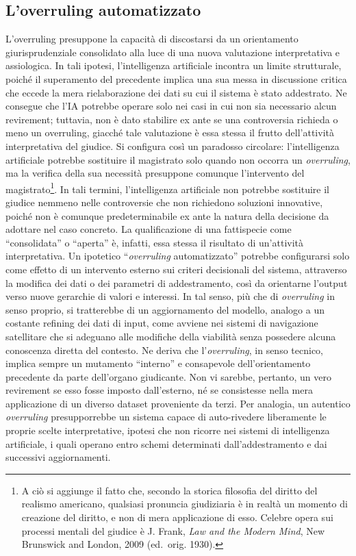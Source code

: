 \documentclass[american,a4paper,]{article}
\begin{document}
\subsection{L'overruling automatizzato}\label{loverruling-automatizzato}

L'overruling presuppone la capacità di discostarsi da un orientamento giurisprudenziale consolidato alla luce di una nuova valutazione interpretativa e assiologica. In tali ipotesi, l'intelligenza artificiale incontra un limite strutturale, poiché il superamento del precedente implica una sua messa in discussione critica che eccede la mera rielaborazione dei dati su cui il sistema è stato addestrato. Ne consegue che l'IA potrebbe operare solo nei casi in cui non sia necessario alcun revirement; tuttavia, non è dato stabilire ex ante se una controversia richieda o meno un overruling, giacché tale valutazione è essa stessa il frutto dell'attività interpretativa del giudice. Si configura così un paradosso circolare: l'intelligenza artificiale potrebbe sostituire il magistrato solo quando non occorra un \emph{overruling}, ma la verifica della sua necessità presuppone comunque l'intervento del magistrato\footnote{A ciò si aggiunge il fatto che, secondo la storica filosofia del diritto del realismo americano, qualsiasi pronuncia giudiziaria è in realtà un momento di creazione del diritto, e non di mera applicazione di esso. Celebre opera sui processi mentali del giudice è J. Frank, \emph{Law and the Modern Mind}, New Brunswick and London, 2009 (ed.~orig. 1930).}. In tali termini, l'intelligenza artificiale non potrebbe sostituire il giudice nemmeno nelle controversie che non richiedono soluzioni innovative, poiché non è comunque predeterminabile ex ante la natura della decisione da adottare nel caso concreto. La qualificazione di una fattispecie come ``consolidata'' o ``aperta'' è, infatti, essa stessa il risultato di un'attività interpretativa. Un ipotetico ``\emph{overruling} automatizzato'' potrebbe configurarsi solo come effetto di un intervento esterno sui criteri decisionali del sistema, attraverso la modifica dei dati o dei parametri di addestramento, così da orientarne l'output verso nuove gerarchie di valori e interessi. In tal senso, più che di \emph{overruling} in senso proprio, si tratterebbe di un aggiornamento del modello, analogo a un costante refining dei dati di input, come avviene nei sistemi di navigazione satellitare che si adeguano alle modifiche della viabilità senza possedere alcuna conoscenza diretta del contesto. Ne deriva che l'\emph{overruling}, in senso tecnico, implica sempre un mutamento ``interno'' e consapevole dell'orientamento precedente da parte dell'organo giudicante. Non vi sarebbe, pertanto, un vero revirement se esso fosse imposto dall'esterno, né se consistesse nella mera applicazione di un diverso dataset proveniente da terzi. Per analogia, un autentico \emph{overruling} presupporrebbe un sistema capace di auto-rivedere liberamente le proprie scelte interpretative, ipotesi che non ricorre nei sistemi di intelligenza artificiale, i quali operano entro schemi determinati dall'addestramento e dai successivi aggiornamenti.
\end{document}

